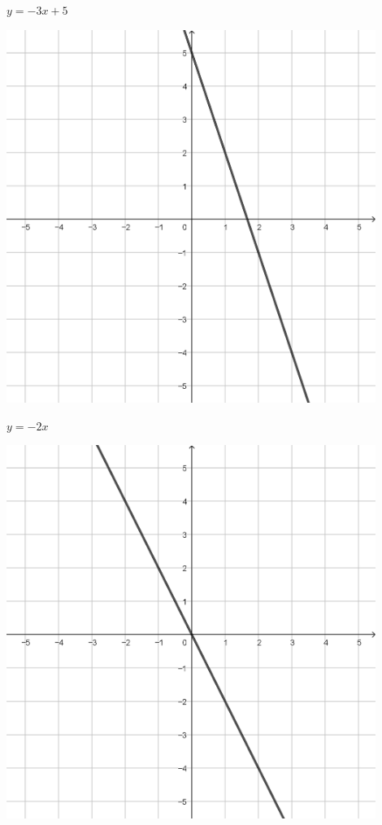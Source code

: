 \documentclass{oblivoir}
\begin{document}
\begin{minipage}{0.45\textwidth}
\begin{minipage}{0.45\textwidth}
\end{minipage}\bigskip\bigskip\par
\begin{minipage}{0.45\textwidth}\centering
\(y=-3x+5\)
\par\bigskip\includegraphics[width=0.9\textwidth]{L03}
\end{minipage}
\begin{minipage}{0.45\textwidth}\centering
\(y=-2x\)
\par\bigskip\includegraphics[width=0.9\textwidth]{L04}

\end{minipage}
\end{minipage}
\end{document}

